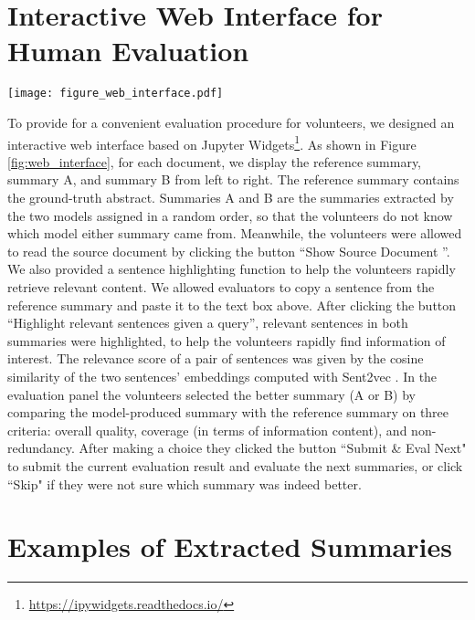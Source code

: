 \documentclass[11pt]{article}
\begin{document}
\section{Interactive Web Interface for Human Evaluation}
\label{sec:web-interface}
\begin{figure*}
\centering
  \texttt{[image: figure\_web\_interface.pdf]}
  \caption{We designed an interactive web interface for the human evaluation experiments introduced in Section \ref{sec:human-evaluation}.}
  \label{fig:web_interface}
\end{figure*}

To provide for a convenient evaluation procedure for volunteers, we designed an interactive web interface based on Jupyter Widgets\footnote{\url{https://ipywidgets.readthedocs.io/}}. As shown in Figure \ref{fig:web_interface}, for each document, we display the reference summary, summary A, and summary B from left to right. The reference summary contains the ground-truth abstract. Summaries A and B are the summaries extracted by the two models assigned in a random order, so that the volunteers do not know which model either summary came from. Meanwhile, the volunteers were allowed to read the source document by clicking the button ``Show Source Document ''. We also provided a sentence highlighting function to help the volunteers rapidly retrieve relevant content. We allowed evaluators to copy a sentence from the reference summary and paste it to the text box above. After clicking the button ``Highlight relevant sentences given a query'', relevant sentences in both summaries were highlighted, to help the volunteers rapidly find information of interest. The relevance score of a pair of sentences was given by the cosine similarity of the two sentences' embeddings computed with Sent2vec \cite{pgj2017unsup}. In the evaluation panel the volunteers selected the better summary (A or B) by comparing the model-produced summary with the reference summary on three criteria: overall quality, coverage (in terms of information content), and non-redundancy. After making a choice they clicked the button ``Submit \& Eval Next" to submit the current evaluation result and evaluate the next summaries, or click ``Skip" if they were not sure which summary was indeed better.


\section{Examples of Extracted Summaries}
\end{document}

